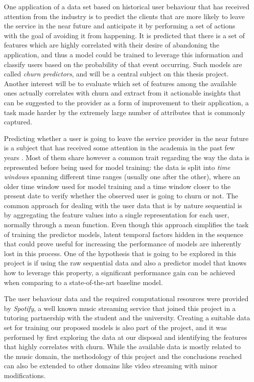 \documentclass{kththesis}
\begin{document}
	One application of a data set based on historical user behaviour that has received attention from the industry is to predict the clients that are more likely to leave the service in the near future and anticipate it by performing a set of actions with the goal of avoiding it from happening. It is predicted that there is a set of features which are highly correlated with their desire of abandoning the application, and thus a model could be trained to leverage this information and classify users based on the probability of that event occurring. Such models are called \emph{churn predictors}, and will be a central subject on this thesis project. Another interest will be to evaluate which set of features among the available ones actually correlates with churn and extract from it actionable insights that can be suggested to the provider as a form of improvement to their application, a task made harder by the extremely large number of attributes that is commonly captured.
	 
	Predicting whether a user is going to leave the service provider in the near future is a subject that has received some attention in the academia in the past few years . Most of them share however a common trait regarding the way the data is represented before being used for model training: the data is split into \emph{time windows} spanning different time ranges (usually one after the other), where an older time window used for model training and a time window closer to the present date to verify whether the observed user is going to churn or not. The common approach for dealing with the user data that is by nature sequential is by aggregating the feature values into a single representation for each user, normally through a mean function. Even though this approach simplifies the task of training the predictor models, latent temporal factors hidden in the sequence that could prove useful for increasing the performance of models are inherently lost in this process. One of the hypothesis that is going to be explored in this project is if using the raw sequential data and also a predictor model that knows how to leverage this property, a significant performance gain can be achieved when comparing to a state-of-the-art baseline model.
	 
	The user behaviour data and the required computational resources were provided by \emph{Spotify}, a well known music streaming service that joined this project in a tutoring partnership with the student and the university. Creating a suitable data set for training our proposed models is also part of the project, and it was performed by first exploring the data at our disposal and identifying the features that highly correlates with churn. While the available data is mostly related to the music domain, the methodology of this project and the conclusions reached can also be extended to other domains like video streaming with minor modifications.
	
\end{document}
